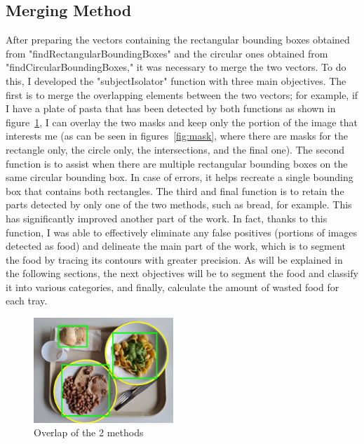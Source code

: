 \documentclass[
	a4paper, %
	10pt, %
	unnumberedsections, %
	twoside, %
]{LTJournalArticle}
\begin{document}
\subsection{Merging Method}
After preparing the vectors containing the rectangular bounding boxes obtained from "findRectangularBoundingBoxes" and the circular ones obtained from "findCircularBoundingBoxes," it was necessary to merge the two vectors. To do this, I developed the "subjectIsolator" function with three main objectives. The first is to merge the overlapping elements between the two vectors; for example, if I have a plate of pasta that has been detected by both functions as shown in figure~\ref{fig:merginbox_tray1.1}, I can overlay the two masks and keep only the portion of the image that interests me (as can be seen in figures~\ref{fig:mask}, where there are masks for the rectangle only, the circle only, the intersections, and the final one). The second function is to assist when there are multiple rectangular bounding boxes on the same circular bounding box. In case of errors, it helps recreate a single bounding box that contains both rectangles. The third and final function is to retain the parts detected by only one of the two methods, such as bread, for example. This has significantly improved another part of the work. In fact, thanks to this function, I was able to effectively eliminate any false positives (portions of images detected as food) and delineate the main part of the work, which is to segment the food by tracing its contours with greater precision. As will be explained in the following sections, the next objectives will be to segment the food and classify it into various categories, and finally, calculate the amount of wasted food for each tray.\\

\begin{figure}[t]
    \centering
    \includegraphics[width=0.47\textwidth]{Images/merginbox_tray1.1.jpg}
    \caption{Overlap of the 2 methods}
    \label{fig:merginbox_tray1.1}
\end{figure}
\end{document}
